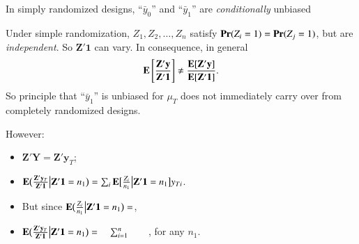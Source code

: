 \begin{frame}{In simply randomized designs, ``$\bar{y}_{0}$'' and 
    ``$\bar{y}_{1}$'' are \emph{conditionally} unbiased} 

Under simple randomization, $Z_{1}, Z_{2}, \ldots, Z_{n}$ satisfy
$\mathbf{Pr}(Z_{i} =1) = \mathbf{Pr}(Z_{j} = 1)$, but are \textit{independent}.  So
$\mathbf{Z}'\mathbf{1}$ can vary. In consequence, in general
$$ \mathbf{E}\left[\frac{\mathbf{Z}'\mathbf{y}}{\mathbf{Z}'\mathbf{1}} \right] \neq
\frac{\mathbf{E}[ \mathbf{Z}'\mathbf{y} ]}{\mathbf{E}[ \mathbf{Z}'\mathbf{1} ]} .$$
 So principle that ``$\bar{y}_1$'' is unbiased for $\mu_{T}$ does not
 immediately carry over from completely randomized designs.
\pause

However:
  \begin{itemize}
  \item $\mathbf{Z}'\mathbf{Y} = \mathbf{Z}'\mathbf{y}_{T}$;
\item $\mathbf{E}  \big(
  \frac{\mathbf{Z}'\mathbf{y}_{T}}{\mathbf{Z}'\mathbf{1}}\big|
  \mathbf{Z}'\mathbf{1} =n_{1}\big) = \sum_{i} \mathbf{E}
  \big[\frac{Z_{i}}{n_{1}} \big|
  \mathbf{Z}'\mathbf{1} = n_{1} \big] y_{Ti} $. 
\item But since $ \mathbf{E} \big(\frac{Z_{i}}{n_{1}} \big|
  \mathbf{Z}'\mathbf{1} =n_{1}\big)=$\hspace{5em},
\item $\mathbf{E}  \big(
  \frac{\mathbf{Z}'\mathbf{y}_{T}}{\mathbf{Z}'\mathbf{1}}\big|
  \mathbf{Z}'\mathbf{1} =n_{1}\big) = \hspace{1em} \sum_{i=1}^{n} \hspace{2em}$, for any $n_{1}$. 
  \end{itemize}
\end{frame}

